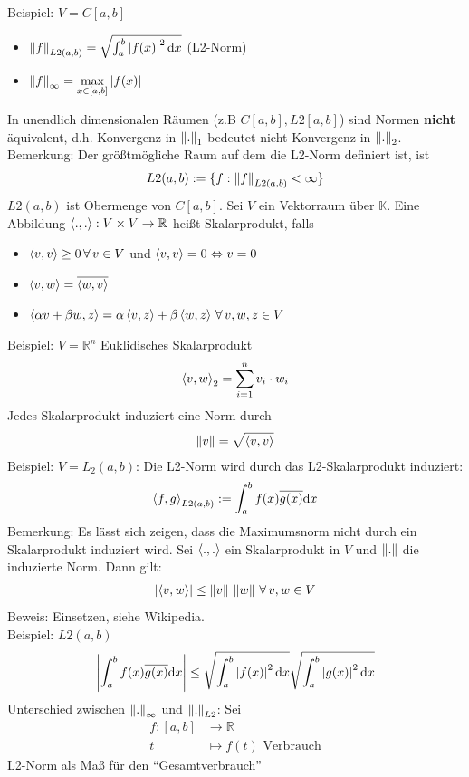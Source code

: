 Beispiel: $V=C[a,b]$
\begin{itemize}
  \item $\left\lVert f \right\rVert_{L2(a,b)} = \sqrt{\int_a^b \left| f(x) \right|^2 \mathrm{d}x}$ (L2-Norm)
  \item $\left\lVert f \right\rVert_{\infty} = \underset{x \in [a, b]}{\max} \left| f(x) \right|$
\end{itemize}
In unendlich dimensionalen Räumen (z.B $C[a,b], L2[a,b]$) sind Normen
\large{\textcolor{rot}{\textbf{nicht}}} äquivalent, d.h. Konvergenz 
in $\left\lVert . \right\rVert_1$ bedeutet nicht Konvergenz in $\left\lVert . \right\rVert_2$.\\
Bemerkung: Der größtmögliche Raum auf dem die L2-Norm definiert ist, ist
\begin{align*}
  L2(a,b) := \{f:\left\lVert f \right\rVert_{L2(a,b)} < \infty\}
\end{align*}
$L2(a,b)$ ist Obermenge von $C[a,b]$.
 Sei $V$ ein Vektorraum über $\mathbb{K}$. Eine Abbildung $\left\langle ., . \right\rangle:V \times V \rightarrow \mathbb{R}$
heißt Skalarprodukt, falls
\begin{itemize}
  \item $\left\langle v, v \right\rangle \geq 0\, \forall\, v \in V$ und $\left\langle v, v \right\rangle=0 \Leftrightarrow v=0$
  \item $\left\langle v, w \right\rangle = \overline{\left\langle w, v \right\rangle}$
  \item $\left\langle \alpha v + \beta w, z \right\rangle = \alpha \left\langle v, z \right\rangle + \beta \left\langle w, z \right\rangle \, \forall\,v,w,z\in V$
\end{itemize}
Beispiel: $V=\mathbb{R}^n$ Euklidisches Skalarprodukt
\begin{align*}
  \left\langle v, w \right\rangle_2 = \sum\limits_{i=1}^{n}{v}_i \cdot w_i
\end{align*}
 Jedes Skalarprodukt induziert eine Norm durch
\begin{align*}
  \left\lVert v \right\rVert=\sqrt{\left\langle v, v \right\rangle}
\end{align*}
Beispiel: $V=L_2(a,b)$: Die L2-Norm wird durch das L2-Skalarprodukt induziert:
\begin{align*}
  \left\langle f, g \right\rangle_{L2(a,b)} := \int_a^b f(x) \overline{g(x)} \mathrm{d}x
\end{align*}
Bemerkung: Es lässt sich zeigen, dass die Maximumsnorm
nicht durch ein Skalarprodukt induziert wird.
 Sei $\left\langle ., . \right\rangle$ ein Skalarprodukt in $V$
und $\left\lVert . \right\rVert$ die induzierte Norm. Dann gilt:
\begin{align*}
  \left| \left\langle v, w \right\rangle \right| \leq \left\lVert v \right\rVert\,\left\lVert w \right\rVert\, \forall\, v,w \in V
\end{align*}
Beweis: Einsetzen, siehe Wikipedia.\\
Beispiel: $L2(a,b)$
\begin{align*}
  \left| \int_a^b f(x)\overline{g(x)}\mathrm{d}x \right| \leq \sqrt{\int_a^b \left| f(x) \right|^2 \mathrm{d}x}\sqrt{\int_a^b \left| g(x) \right|^2 \mathrm{d}x}
\end{align*}
Unterschied zwischen $\left\lVert . \right\rVert_{\infty}$ und $\left\lVert . \right\rVert_{L2}$: Sei
\begin{align*}
  f:[a,b] & \longrightarrow \mathbb{R} \\
  t &\mapsto f(t) \text{ Verbrauch}
\end{align*}
L2-Norm als Maß für den ``Gesamtverbrauch''
